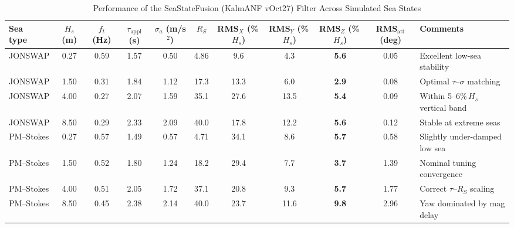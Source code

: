 \documentclass[11pt,letterpaper]{article}
\begin{document}
\begin{table*}[t]
\centering
\caption{Performance of the SeaStateFusion (KalmANF vOct27) Filter Across Simulated Sea States}
\label{tab:seastate_performance}
\renewcommand{\arraystretch}{1.1}
\setlength{\tabcolsep}{3pt}
\small
\begin{tabular}{p{1.7cm}ccccccccc p{3.0cm}}
\toprule
\textbf{Sea\\type} &
\textbf{$H_s$\\(m)} &
\textbf{$f_t$\\(Hz)} &
\textbf{$\tau_{\text{appl}}$\\(s)} &
\textbf{$\sigma_a$\\(m/s$^2$)} &
\textbf{$R_S$} &
\textbf{RMS$_X$\\(\%\,$H_s$)} &
\textbf{RMS$_Y$\\(\%\,$H_s$)} &
\textbf{RMS$_Z$\\(\%\,$H_s$)} &
\textbf{RMS$_{\text{att}}$\\(deg)} &
\textbf{Comments}\\
\midrule
JONSWAP & 0.27 & 0.59 & 1.57 & 0.50 & 4.86 &
9.6 & 4.3 & \textbf{5.6} & 0.05 &
Excellent low-sea stability \\[2pt]
JONSWAP & 1.50 & 0.31 & 1.84 & 1.12 & 17.3 &
13.3 & 6.0 & \textbf{2.9} & 0.08 &
Optimal $\tau$--$\sigma$ matching \\[2pt]
JONSWAP & 4.00 & 0.27 & 2.07 & 1.59 & 35.1 &
27.6 & 13.5 & \textbf{5.4} & 0.09 &
Within 5--6\%\,$H_s$ vertical band \\[2pt]
JONSWAP & 8.50 & 0.29 & 2.33 & 2.09 & 40.0 &
17.8 & 12.2 & \textbf{5.6} & 0.12 &
Stable at extreme seas \\[2pt]
\midrule
PM--Stokes & 0.27 & 0.57 & 1.49 & 0.57 & 4.71 &
34.1 & 8.6 & \textbf{5.7} & 0.58 &
Slightly under-damped low sea \\[2pt]
PM--Stokes & 1.50 & 0.52 & 1.80 & 1.24 & 18.2 &
29.4 & 7.7 & \textbf{3.7} & 1.39 &
Nominal tuning convergence \\[2pt]
PM--Stokes & 4.00 & 0.51 & 2.05 & 1.72 & 37.1 &
20.8 & 9.3 & \textbf{5.7} & 1.77 &
Correct $\tau$--$R_S$ scaling \\[2pt]
PM--Stokes & 8.50 & 0.45 & 2.38 & 2.14 & 40.0 &
23.7 & 11.6 & \textbf{9.8} & 2.96 &
Yaw dominated by mag delay \\
\bottomrule
\end{tabular}
\end{table*}
\end{document}
